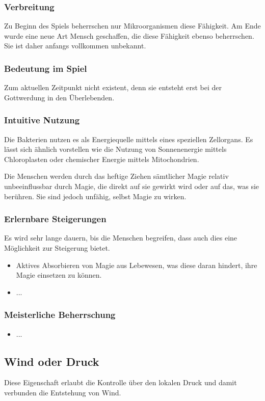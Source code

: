 \subsubsection{Verbreitung}
Zu Beginn des Spiels beherrschen nur Mikroorganismen diese Fähigkeit. Am Ende wurde eine neue Art Mensch geschaffen, die diese Fähigkeit ebenso beherrschen. Sie ist daher anfangs vollkommen unbekannt.

\subsubsection{Bedeutung im Spiel}
Zum aktuellen Zeitpunkt nicht existent, denn sie entsteht erst bei der Gottwerdung in den Überlebenden.

\subsubsection{Intuitive Nutzung}
Die Bakterien nutzen es als Energiequelle mittels eines speziellen Zellorgans. Es lässt sich ähnlich vorstellen wie die Nutzung von Sonnenenergie mittels Chloroplasten oder chemischer Energie mittels Mitochondrien. 

Die Menschen werden durch das heftige Ziehen sämtlicher Magie relativ unbeeinflussbar durch Magie, die direkt auf sie gewirkt wird oder auf das, was sie berühren. Sie sind jedoch unfähig, selbst Magie zu wirken.

\subsubsection{Erlernbare Steigerungen}
Es wird sehr lange dauern, bis die Menschen begreifen, dass auch dies eine Möglichkeit zur Steigerung bietet.
\begin{itemize}
	\item Aktives Absorbieren von Magie aus Lebewesen, was diese daran hindert, ihre Magie einsetzen zu können.
	\item ...
\end{itemize}

\subsubsection{Meisterliche Beherrschung} 
\begin{itemize}
	\item ...
\end{itemize}




\subsection{Wind oder Druck}\label{sec:druckmagie}
Diese Eigenschaft erlaubt die Kontrolle über den lokalen Druck und damit verbunden die Entstehung von Wind.

